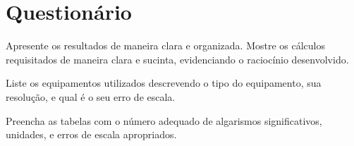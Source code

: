 
\vspace{15mm}

\begin{fullwidth}
\noindent{}
\vspace{5mm}

\noindent{}

\noindent{}

\noindent{}

\noindent{}

\noindent{}
\end{fullwidth}

\vspace{5mm}

\section{Questionário}

\begin{question}[type={exam}]{1}
Apresente os resultados de maneira clara e organizada. Mostre os cálculos requisitados de maneira clara e sucinta, evidenciando o raciocínio desenvolvido.
\end{question}

\begin{question}[type={exam}]{0.75}
Liste os equipamentos utilizados descrevendo o tipo do equipamento, sua resolução, e qual é o seu erro de escala.
\end{question}

\begin{question}[type={exam}]{0.75}
Preencha as tabelas com o número adequado de algarismos significativos, unidades, e erros de escala apropriados. 
\end{question}

